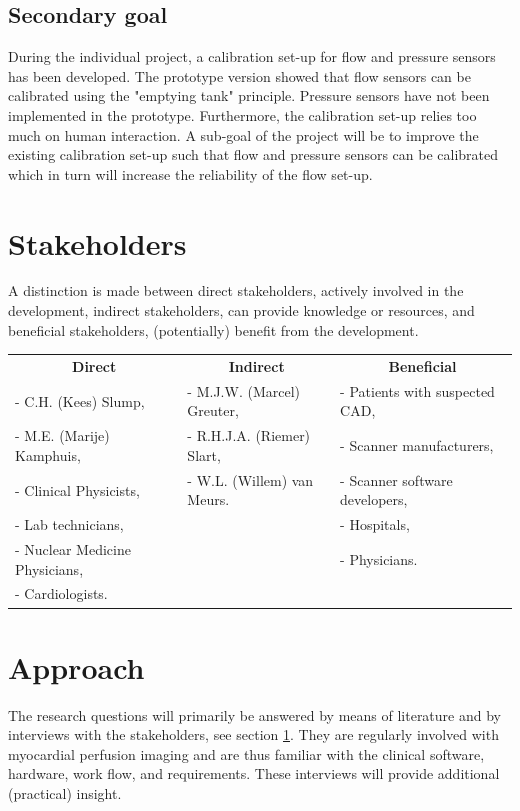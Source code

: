 \subsection{Secondary goal}
During the individual project, a calibration set-up for flow and pressure sensors has been developed. The prototype version showed that flow sensors can be calibrated using the "emptying tank" principle. Pressure sensors have not been implemented in the prototype. Furthermore, the calibration set-up relies too much on human interaction. A sub-goal of the project will be to improve the existing calibration set-up such that flow and pressure sensors can be calibrated which in turn will increase the reliability of the flow set-up.

\section{Stakeholders}
\label{sec:stakeholders}
A distinction is made between direct stakeholders, actively involved in the development, indirect stakeholders, can provide knowledge or resources, and beneficial stakeholders, (potentially) benefit from the development.

\begin{tabular}{lll}
 	\multicolumn{1}{c}{\textbf{Direct}} & \multicolumn{1}{c}{\textbf{Indirect}} & \multicolumn{1}{c}{\textbf{Beneficial}} \\
	 - C.H. (Kees) Slump, &  - M.J.W. (Marcel) Greuter, & - Patients with suspected \ac{CAD}, \\
	 - M.E. (Marije) Kamphuis, & - R.H.J.A. (Riemer) Slart, & - Scanner manufacturers,\\
	 - Clinical Physicists, & - W.L. (Willem) van Meurs. & - Scanner software developers, \\
	 - Lab technicians, & & - Hospitals, \\
	 - Nuclear Medicine Physicians, & & - Physicians.\\
	 - Cardiologists. & & \\
\end{tabular}

\section{Approach}
The research questions will primarily be answered by means of literature and by interviews with the stakeholders, see section \ref{sec:stakeholders}. They are regularly involved with myocardial perfusion imaging and are thus familiar with the clinical software, hardware, work flow, and requirements. These interviews will provide additional (practical) insight.

